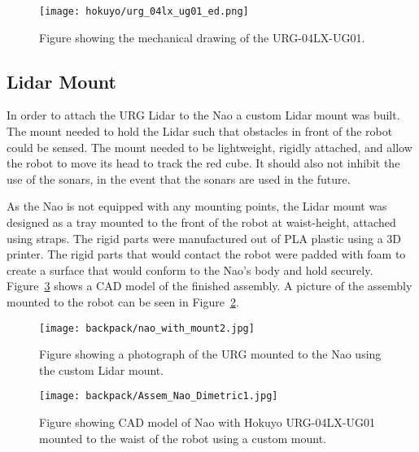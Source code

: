 \begin{figure}
\centering
\texttt{[image: hokuyo/urg\_04lx\_ug01\_ed.png]}
\caption{Figure showing the mechanical drawing of the URG-04LX-UG01.}
\label{fig:lidar_diagram1}
\end{figure}





\clearpage

\subsection{Lidar Mount}
In order to attach the URG Lidar to the Nao a custom Lidar mount was built.
The mount needed to hold the Lidar such that obstacles in front of the robot
could be sensed. The mount needed to be lightweight, rigidly attached, and allow
the robot to move its head to track the red cube. It should also not inhibit
the use of the sonars, in the event that the sonars are used in the future.

As the Nao is not equipped with any mounting points, the Lidar mount was 
designed as a tray mounted to the front of the robot at waist-height, attached
using straps. The rigid parts were manufactured out of PLA plastic using a 3D
printer. The rigid parts that would contact the robot were padded with foam to
create a surface that would conform to the Nao's body and hold securely.
Figure~\ref{fig:nao_lidar_mount_nao_dimetric1} shows a CAD model of the finished
assembly.
A picture of the assembly mounted to the robot can be seen in
Figure~\ref{fig:nao_lidar_mount_picture1}.

\begin{figure}
\centering
\texttt{[image: backpack/nao\_with\_mount2.jpg]}
\caption{Figure showing a photograph of the URG mounted to the Nao using the
         custom Lidar mount.}
\label{fig:nao_lidar_mount_picture1}
\end{figure}

\begin{figure}
\centering
\texttt{[image: backpack/Assem\_Nao\_Dimetric1.jpg]}
\caption{Figure showing CAD model of Nao with Hokuyo URG-04LX-UG01 mounted
         to the waist of the robot using a custom mount.}
\label{fig:nao_lidar_mount_nao_dimetric1}
\end{figure}

